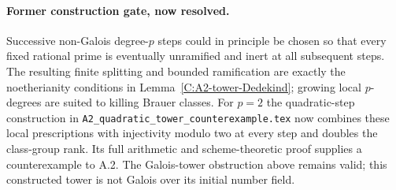 \paragraph{Former construction gate, now resolved.}
Successive non-Galois degree-$p$ steps could in principle be
chosen so that every fixed rational prime is eventually
unramified and inert at all subsequent steps.  The resulting
finite splitting and bounded ramification are exactly the
noetherianity conditions in Lemma~\ref{C:A2-tower-Dedekind};
growing local $p$-degrees are suited to killing Brauer classes.
For $p=2$ the quadratic-step construction in
\texttt{A2\_quadratic\_tower\_counterexample.tex} now combines these
local prescriptions with injectivity modulo two at every step and
doubles the class-group rank. Its full arithmetic and scheme-theoretic
proof supplies a counterexample to A.2. The Galois-tower obstruction
above remains valid; this constructed tower is not Galois over its
initial number field.
